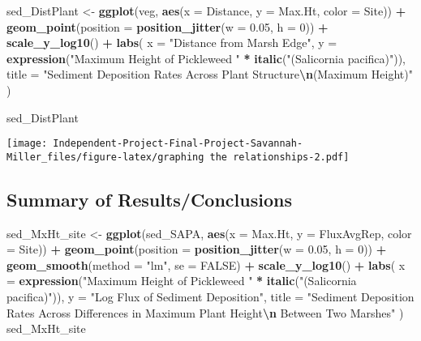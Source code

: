 \documentclass[
]{article}
\newenvironment{Shaded}{\begin{snugshade}}{\end{snugshade}}
\newcommand{\AttributeTok}[1]{\textcolor[rgb]{0.13,0.29,0.53}{#1}}
\newcommand{\ConstantTok}[1]{\textcolor[rgb]{0.56,0.35,0.01}{#1}}
\newcommand{\DecValTok}[1]{\textcolor[rgb]{0.00,0.00,0.81}{#1}}
\newcommand{\FloatTok}[1]{\textcolor[rgb]{0.00,0.00,0.81}{#1}}
\newcommand{\FunctionTok}[1]{\textcolor[rgb]{0.13,0.29,0.53}{\textbf{#1}}}
\newcommand{\NormalTok}[1]{#1}
\newcommand{\OtherTok}[1]{\textcolor[rgb]{0.56,0.35,0.01}{#1}}
\newcommand{\SpecialCharTok}[1]{\textcolor[rgb]{0.81,0.36,0.00}{\textbf{#1}}}
\newcommand{\StringTok}[1]{\textcolor[rgb]{0.31,0.60,0.02}{#1}}
\begin{document}
\begin{Shaded}
\begin{Highlighting}[]
\NormalTok{sed\_DistPlant }\OtherTok{\textless{}{-}} \FunctionTok{ggplot}\NormalTok{(veg, }\FunctionTok{aes}\NormalTok{(}\AttributeTok{x =}\NormalTok{ Distance, }\AttributeTok{y =}\NormalTok{ Max.Ht, }\AttributeTok{color =}\NormalTok{ Site)) }\SpecialCharTok{+} 
  \FunctionTok{geom\_point}\NormalTok{(}\AttributeTok{position =} \FunctionTok{position\_jitter}\NormalTok{(}\AttributeTok{w =} \FloatTok{0.05}\NormalTok{, }\AttributeTok{h =} \DecValTok{0}\NormalTok{)) }\SpecialCharTok{+}
  \FunctionTok{scale\_y\_log10}\NormalTok{() }\SpecialCharTok{+} 
  \FunctionTok{labs}\NormalTok{(}
    \AttributeTok{x =} \StringTok{"Distance from Marsh Edge"}\NormalTok{,}
    \AttributeTok{y =} \FunctionTok{expression}\NormalTok{(}\StringTok{"Maximum Height of Pickleweed "} \SpecialCharTok{*} \FunctionTok{italic}\NormalTok{(}\StringTok{"(Salicornia pacifica)"}\NormalTok{)),}
    \AttributeTok{title =} \StringTok{"Sediment Deposition Rates Across Plant Structure}\SpecialCharTok{\textbackslash{}n}\StringTok{(Maximum Height)"}
\NormalTok{  )}

\NormalTok{sed\_DistPlant}
\end{Highlighting}
\end{Shaded}

\texttt{[image: Independent-Project-Final-Project-Savannah-Miller\_files/figure-latex/graphing the relationships-2.pdf]}

\subsection{Summary of
Results/Conclusions}\label{summary-of-resultsconclusions}

\begin{Shaded}
\begin{Highlighting}[]
\NormalTok{sed\_MxHt\_site }\OtherTok{\textless{}{-}} \FunctionTok{ggplot}\NormalTok{(sed\_SAPA, }\FunctionTok{aes}\NormalTok{(}\AttributeTok{x =}\NormalTok{ Max.Ht, }\AttributeTok{y =}\NormalTok{ FluxAvgRep, }\AttributeTok{color =}\NormalTok{ Site)) }\SpecialCharTok{+}
  \FunctionTok{geom\_point}\NormalTok{(}\AttributeTok{position =} \FunctionTok{position\_jitter}\NormalTok{(}\AttributeTok{w =} \FloatTok{0.05}\NormalTok{, }\AttributeTok{h =} \DecValTok{0}\NormalTok{)) }\SpecialCharTok{+}
  \FunctionTok{geom\_smooth}\NormalTok{(}\AttributeTok{method =} \StringTok{"lm"}\NormalTok{, }\AttributeTok{se =} \ConstantTok{FALSE}\NormalTok{) }\SpecialCharTok{+}
  \FunctionTok{scale\_y\_log10}\NormalTok{() }\SpecialCharTok{+}
  \FunctionTok{labs}\NormalTok{(}
    \AttributeTok{x =} \FunctionTok{expression}\NormalTok{(}\StringTok{"Maximum Height of Pickleweed "} \SpecialCharTok{*} \FunctionTok{italic}\NormalTok{(}\StringTok{"(Salicornia pacifica)"}\NormalTok{)),}
    \AttributeTok{y =} \StringTok{"Log Flux of Sediment Deposition"}\NormalTok{,}
    \AttributeTok{title =} \StringTok{"Sediment Deposition Rates Across Differences in Maximum Plant Height}\SpecialCharTok{\textbackslash{}n}\StringTok{ Between Two Marshes"}
\NormalTok{  )}
\NormalTok{sed\_MxHt\_site}
\end{Highlighting}
\end{Shaded}
\end{document}
